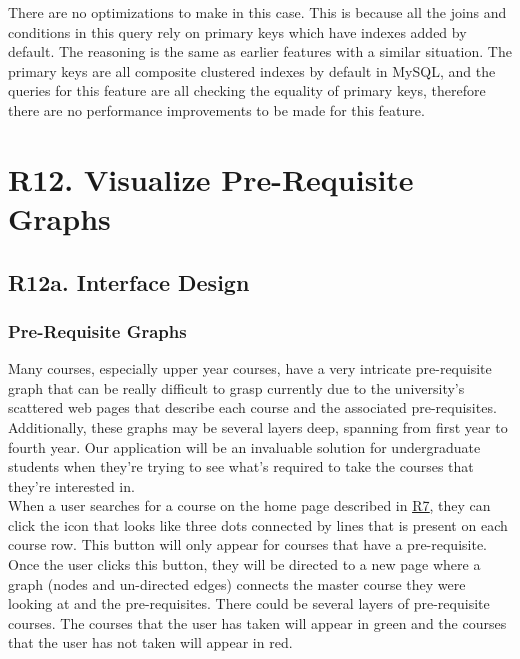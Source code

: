 \documentclass[12pt, a4paper]{article}
\begin{document}
There are no optimizations to make in this case. This is because all the joins and conditions in this query rely on primary keys which have indexes added by default. The reasoning is the same as earlier features with a similar situation. The primary keys are all composite clustered indexes by default in MySQL, and the queries for this feature are all checking the equality of primary keys, therefore there are no performance improvements to be made for this feature. 
\section*{R12. Visualize Pre-Requisite Graphs}
\label{sec:R12}
\subsection*{R12a. Interface Design}
\subsubsection*{Pre-Requisite Graphs}
Many courses, especially upper year courses, have a very intricate pre-requisite graph that can be really difficult to grasp currently due to the university's scattered web pages that describe each course and the associated pre-requisites. Additionally, these graphs may be several layers deep, spanning from first year to fourth year. Our application will be an invaluable solution for undergraduate students when they're trying to see what's required to take the courses that they're interested in.\\

When a user searches for a course on the home page described in \underline{\hyperref[sec:R7]{R7}}, they can click the icon that looks like three dots connected by lines that is present on each course row. This button will only appear for courses that have a pre-requisite. Once the user clicks this button, they will be directed to a new page where a graph (nodes and un-directed edges) connects the master course they were looking at and the pre-requisites. There could be several layers of pre-requisite courses. The courses that the user has taken will appear in green and the courses that the user has not taken will appear in red.
\end{document}
